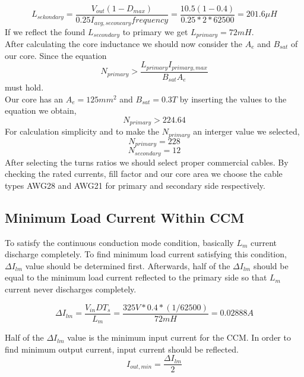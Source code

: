 \documentclass[12pt]{article}
\begin{document}
\begin{equation*}
    L_{sekondary}=\dfrac{V_{out}(1-D_{max})}{0.25I_{avg,seconcary}frequency}=\dfrac{10.5(1-0.4)}{0.25*2*62500}=201.6 \mu H
\end{equation*}
If we reflect the found $L_{secondary}$ to primary we get
$L_{primary}=72mH$. \\
After calculating the core inductance we should now consider the $A_{e}$ and $B_{sat}$ of our core. Since the equation
\begin{equation*}
   N_{primary}>\dfrac{L_{primary}I_{primary,max}}{B_{sat}A_{e}}
\end{equation*}
must hold.\\
Our core has an $A_{e}=125mm^2$ and $B_{sat}=0.3T$ by inserting the values to the equation we obtain,
\begin{equation*}
   N_{primary}> 224.64
\end{equation*}
For calculation simplicity and to make the $N_{primary}$
an interger value we selected,
\begin{equation*}
   N_{primary}= 228
\end{equation*}
\begin{equation*}
   N_{secondary}= 12
\end{equation*}
After selecting the turns ratios we should select proper commercial cables. By checking the rated currents, fill factor and our core area we choose the cable types AWG28 and AWG21 for primary and secondary side respectively.

\subsection{Minimum Load Current Within CCM}
To satisfy the continuous conduction mode condition, basically $L_{m}$ current discharge completely. To find minimum load current satisfying this condition, $\Delta I_{lm}$ value should be determined first. Afterwards, half of the $\Delta I_{lm}$ should be equal to the minimum load current reflected to the primary side so that $L_{m}$ current never discharges completely.

\begin{equation*}
    \Delta I_{lm}= \dfrac{V_{in}DT_{s}}{L_{m}}= \dfrac{325V* 0.4*(1/62500)}{72mH} = 0.02888 A
\end{equation*}

Half of the $\Delta I_{lm}$ value is the minimum input current for the CCM. In order to find minimum output current, input current should be reflected. 
\begin{equation*}
    I_{out,min}= \dfrac{\Delta I_{lm}}{2}
\end{equation*}
\end{document}
